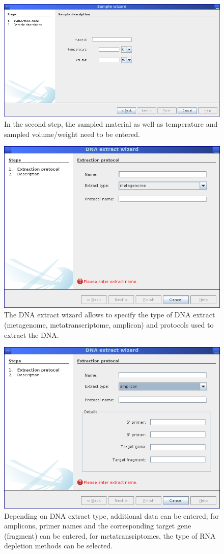 \begin{figure}[H]
\centering
\includegraphics[width=.8\textwidth]{img/mgx/samplewiz2}
\caption[Sample wizard]{In the second step, the sampled material as well as temperature and sampled volume/weight
need to be entered.}
\label{samplewiz2}
\end{figure}

\begin{figure}[H]
\centering
\includegraphics[width=.8\textwidth]{img/mgx/extractwiz1}
\caption[DNA extract wizard]{The DNA extract wizard allows to specify the type of DNA extract (metagenome, 
metatranscriptome, amplicon) and protocols used to extract the DNA.}
\label{extractwiz1}
\end{figure}

\begin{figure}[H]
\centering
\includegraphics[width=.8\textwidth]{img/mgx/extractwiz2}
\caption[DNA extract wizard]{Depending on DNA extract type, additional data can be entered; for amplicons, primer
names and the corresponding target gene (fragment) can be entered, for metatransriptomes, the type of RNA depletion
methods can be selected.}
\label{extractwiz2}
\end{figure}

